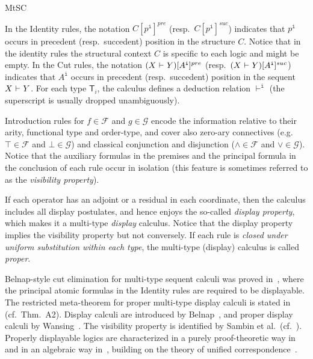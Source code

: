 \begin{entry}{MtSC}
\begin{clarifications}
  In the Identity rules, the notation $C[p^{\texttt{i}}]^{pre}$
  (resp.~$C[p^{\texttt{i}}]^{suc}$) indicates that $p^{\texttt{i}}$ occurs in
  precedent (resp.~succedent) position in the structure $C$. Notice that in the
  identity rules the structural context $C$ is specific to each logic and might be
  empty. In the Cut rules, the notation $(X {\mbox{$\ \vdash\ $}} Y)[A^{\texttt{i}}]^{pre}$
  (resp.~$(X {\mbox{$\ \vdash\ $}} Y)[A^{\texttt{i}}]^{suc}$) indicates that $A^{\texttt{i}}$
  occurs in precedent (resp.~succedent) position in the sequent $X {\mbox{$\ \vdash\ $}} Y$.
  For  each type $\mathsf{T}_i$, the calculus defines a deduction relation
  $\vdash^{\texttt{i}}$ (the superscript is usually dropped unambiguously).
  
  Introduction rules for $f\in\mathcal{F}$ and $g\in\mathcal{G}$ encode the
  information relative to their arity, functional type and order-type, and cover
  also zero-ary connectives (e.g.~$\top\in \mathcal{F}$ and $\bot\in \mathcal{G}$)
  and classical conjunction and disjunction ($\wedge\in \mathcal{F}$ and $\vee\in
  \mathcal{G}$). Notice that the auxiliary formulas in the premises and the
  principal formula in the conclusion of each rule occur in isolation (this
  feature is sometimes referred to as the {\em visibility property}).
  
  If each operator has an adjoint or a residual in each coordinate, then the
  calculus includes all display postulates, and hence enjoys the so-called {\em
  display property}, which makes it a multi-type {\em display} calculus. Notice
  that the display property implies the visibility property but not conversely. If
  each rule is {\em closed under uniform substitution within each type}, the
  multi-type (display) calculus is called {\em proper}. 
\end{clarifications}


\begin{history}
  Belnap-style cut elimination for multi-type sequent calculi was proved
  in~\cite{FrittellaGrecoKurzPalmigianoSikimic2014}, where the principal atomic
  formulas in the Identity rules are required to be displayable. The restricted
  meta-theorem for proper multi-type display calculi is stated
  in~\cite[Sec.~A]{GrecoPalmigiano} (cf.~Thm.~A2). Display calculi are introduced
  by Belnap~\cite{Belnap1982}, and proper display calculi by
  Wansing~\cite{Wansing1998}. The visibility property is identified by Sambin et
  al.~(cf.~\cite{SambinBattilottiFaggian2014}). Properly displayable logics are
  characterized in a purely proof-theoretic way in~\cite{CiabattoniRamanayake2016}
  and in an algebraic way in~\cite{GrecoMaPalmigianoTzimoulisZhao2016}, building
  on the theory of unified correspondence~\cite{ConradieGhilardiPalmigiano2014}.
\end{history}


\end{entry}
